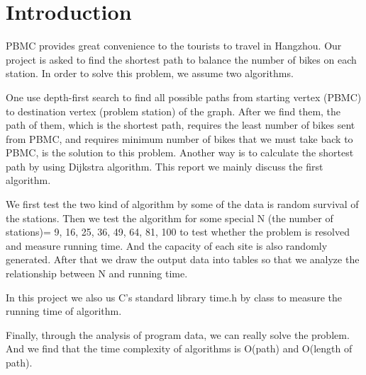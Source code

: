 \chapter{Introduction}

PBMC provides great convenience to the tourists to travel in Hangzhou. Our project is asked to find the shortest path to balance the number of bikes on each station. In order to solve this problem, we assume two algorithms.

One use depth-first search to find all possible paths from starting vertex (PBMC) to destination vertex (problem station) of the graph. After we find them, the path of them, which is the shortest path, requires the least number of bikes sent from PBMC, and requires minimum number of bikes that we must take back to PBMC, is the solution to this problem. Another way is to calculate the shortest path by using Dijkstra algorithm. This report we mainly discuss the first algorithm.

We first test the two kind of algorithm by some of the data is random survival of the stations. Then we test the algorithm for some special N (the number of stations)= 9, 16, 25, 36, 49, 64, 81, 100 to test whether the problem is resolved and measure running time. And the capacity of each site is also randomly generated. After that we draw the output data into tables so that we analyze the relationship between N and running time.

In this project we also us C’s standard library time.h by class to measure the running time of algorithm.

Finally, through the analysis of program data, we can really solve the problem. And we find that the time complexity of algorithms is O(path)  and O(length of path).
